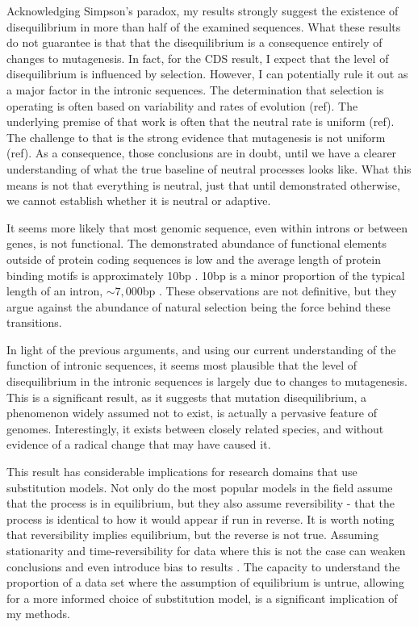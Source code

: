 Acknowledging Simpson's paradox, my results strongly suggest the existence of disequilibrium in more than half of the examined sequences. What these results do not guarantee is that that the disequilibrium is a consequence entirely of changes to mutagenesis. In fact, for the CDS result, I expect that the level of disequilibrium is influenced by selection. However, I can potentially rule it out as a major factor in the intronic sequences. The determination that selection is operating is often based on variability and rates of evolution (ref). The underlying premise of that work is often that the neutral rate is uniform (ref). The challenge to that is the strong evidence that mutagenesis is not uniform (ref). As a consequence, those conclusions are in doubt, until we have a clearer understanding of what the true baseline of neutral processes looks like. What this means is not that everything is neutral, just that until demonstrated otherwise, we cannot establish whether it is neutral or adaptive. 

It seems more likely that most genomic sequence, even within introns or between genes, is not functional. The demonstrated abundance of functional elements outside of protein coding sequences is low \citep{Graur2013OnENCODE} and the average length of protein binding motifs is approximately 10bp \citep{Stewart2012WhyLong}. 10bp is a minor proportion of the typical length of an intron, $\sim7,000$bp \citep{10.1093/database/baw153}. These observations are not definitive, but they argue against the abundance of natural selection being the force behind these transitions. 

In light of the previous arguments, and using our current understanding of the function of intronic sequences, it seems most plausible that the level of disequilibrium in the intronic sequences is largely due to changes to mutagenesis.  This is a significant result, as it suggests that mutation disequilibrium, a phenomenon widely assumed not to exist, is actually a pervasive feature of genomes. Interestingly, it exists between closely related species, and without evidence of a radical change that may have caused it. 

This result has considerable implications for research domains that use substitution models. Not only do the most popular models in the field assume that the process is in equilibrium, but they also assume reversibility - that the process is identical to how it would appear if run in reverse. It is worth noting that reversibility implies equilibrium, but the reverse is not true. Assuming stationarity and time-reversibility for data where this is not the case can weaken conclusions and even introduce bias to results \citep{Kaehler2015}. The capacity to understand the proportion of a data set where the assumption of equilibrium is untrue, allowing for a more informed choice of substitution model, is a significant implication of my methods.  


